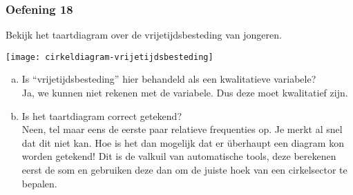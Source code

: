 \documentclass[13pt]{beamer}
\newenvironment{answer}
{\color{blue}}
{\color{black}}
\begin{document}
\begin{frame}
  \frametitle{Oefening 18}
  \begin{minipage}{0.35\linewidth}
    Bekijk het taartdiagram over de vrijetijdsbesteding van jongeren.
  \end{minipage}
  \begin{minipage}{0.6\linewidth}
    \vspace*{-1cm}
    \begin{center}
      \texttt{[image: cirkeldiagram-vrijetijdsbesteding]}
    \end{center}
  \end{minipage}
  \begin{enumerate}[(a)]
  \item Is “vrijetijdsbesteding” hier behandeld als een kwalitatieve variabele?\\
    \begin{answer}
      Ja, we kunnen niet rekenen met de variabele. Dus deze moet kwalitatief zijn.
    \end{answer}
  \item Is het taartdiagram correct getekend?\\
    \begin{answer}
      Neen, tel maar eens de eerste paar relatieve frequenties op. Je merkt al snel dat dit niet kan. Hoe is het dan mogelijk dat er überhaupt een diagram kon worden getekend! Dit is de valkuil van automatische tools, deze berekenen eerst de som en gebruiken deze dan om de juiste hoek van een cirkelsector te bepalen.
    \end{answer}
  \end{enumerate}
\end{frame}
\end{document}
